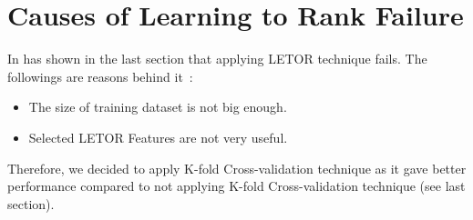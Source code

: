 

\section{Causes of Learning to Rank Failure}
In has shown in the last section that applying LETOR technique fails. The followings are reasons behind it~\cite{craig}:
\begin{itemize}
 \item The size of training dataset is not big enough.
 \item Selected LETOR Features are not very useful.
\end{itemize}
Therefore, we decided to apply K-fold Cross-validation technique as it gave better performance compared to not applying K-fold Cross-validation technique
(see last section).
